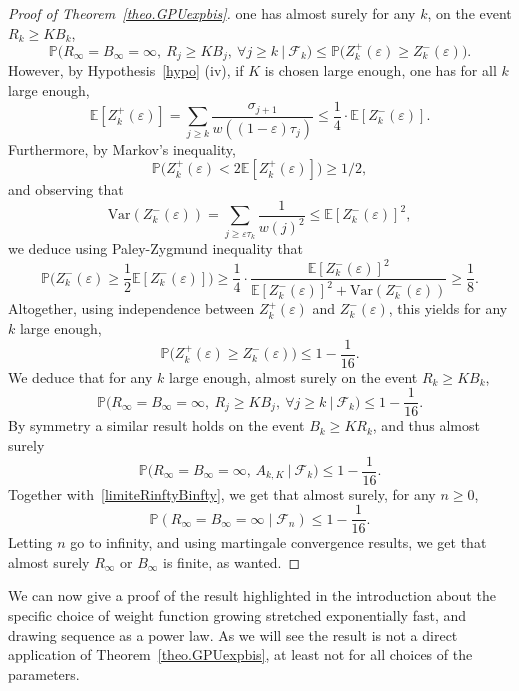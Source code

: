 \documentclass[11pt]{article}
\newcommand{\1}{{\text{\Large $\mathfrak 1$}}}
\begin{document}
\begin{proof}[Proof of Theorem~\ref{theo.GPUexpbis}]
one has almost surely for any $k$, on the event $R_k\ge K B_k$, 
$$\mathbb P\Big(R_\infty = B_\infty = \infty, \ R_j \ge K B_j, \ \forall j\ge k \ \Big|\ \mathcal F_k\Big) \le \mathbb P\big(Z_k^+(\varepsilon) \ge Z_k^-(\varepsilon)\big). $$ 
However, by Hypothesis~\ref{hypo} (iv), if $K$ is chosen large enough, one has for all $k$ large enough, 
$$\mathbb E[Z_k^+(\varepsilon)] = \sum_{j\ge k} \frac{\sigma_{j+1}}{w((1-\varepsilon)\tau_j)} \le \frac 14 \cdot \mathbb E[Z_k^-(\varepsilon)]. $$ 
Furthermore, by Markov's inequality, 
$$\mathbb P\big(Z_k^+(\varepsilon) < 2 \mathbb E[Z_k^+(\varepsilon)] \big) \ge 1/2, $$
and observing that 
$$\text{Var}(Z_k^-(\varepsilon)) = \sum_{j\ge \varepsilon \tau_k} \frac{1}{w(j)^2} \le \mathbb E[Z_k^-(\varepsilon)]^2, $$
we deduce using Paley-Zygmund inequality  that 
$$\mathbb P\Big(Z_k^-(\varepsilon) \ge \frac 12 \mathbb E[Z_k^-(\varepsilon) ]\Big) \ge 
\frac 14\cdot  \frac{\mathbb E[Z_k^-(\varepsilon)]^2}{\mathbb E[Z_k^-(\varepsilon) ]^2 +\text{Var}(Z_k^-(\varepsilon))} \ge \frac 1{8}. $$  
Altogether, using independence between $Z_k^+(\varepsilon)$ and $Z_k^-(\varepsilon)$, this yields for any $k$ large enough, 
$$\mathbb P\big(Z_k^+(\varepsilon) \ge Z_k^-(\varepsilon)\big) \le 1 - \frac 1{16}. $$ 
We deduce that for any $k$ large enough, almost surely on the event $R_k\ge K B_k$, 
$$\mathbb P\Big(R_\infty = B_\infty = \infty, \ R_j \ge K B_j, \ \forall j\ge k \ \Big|\ \mathcal F_k\Big) \le 1- \frac 1{16}. $$ 
By symmetry a similar result holds on the event $B_k \ge KR_k$, and thus almost surely 
$$\mathbb P\big(R_\infty = B_\infty = \infty, \, A_{k,K} \ \big|\ \mathcal F_k\big) \le 1- \frac 1{16}. $$ 
Together with~\eqref{limiteRinftyBinfty}, we get that almost surely, for any $n\ge 0$, 
$$\mathbb P(R_\infty = B_\infty = \infty \mid \mathcal F_n)  \le 1 - \frac 1{16}. $$ 
Letting $n$ go to infinity, and using martingale convergence results, we get that almost surely $R_\infty$ or $B_\infty$ is finite, as wanted. 
\end{proof}

We can now give a proof of the result highlighted in the introduction about the specific choice of weight function growing stretched exponentially fast, and drawing sequence as a power law. As we will see the result is not a direct application of Theorem~\ref{theo.GPUexpbis}, at least not for all choices of the parameters. 
\end{document}
